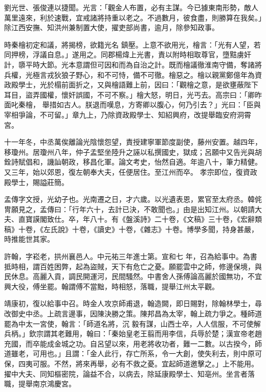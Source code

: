 \begin{pinyinscope}
 劉光世、張俊連以捷聞。光言：「觀金人布置，必有主謀。今已據東南形勢，敵人萬里遠來，利於速戰，宜戒諸將持重以老之。不過數月，彼食盡，則勝算在我矣。」除江西安撫、知洪州兼制置大使，擢吏部尚書，逾月，除參知政事。



 時秦檜初定和議，將揭榜，欲籍光名
 鎮壓。上意不欲用光，檜言：「光有人望，若同押榜，浮議自息。」遂用之。同郡楊煒上光書，責以附時相取尊官，墮黠虜奸計，隳平時大節。光本意謂但可因和而為自治之計。既而檜議徹淮南守備，奪諸將兵權，光極言戎狄狼子野心，和不可恃，備不可徹。檜惡之。檜以親黨鄭億年為資政殿學士，光於榻前面折之，又與檜語難上前，因曰：「觀檜之意，是欲壅蔽陛下耳目，盜弄國權，懷奸誤國，不可不察。」檜大怒，明日，光丐去。高宗曰：「卿昨面叱秦檜，
 舉措如古人。朕退而嘆息，方寄卿以腹心，何乃引去？」光曰：「臣與宰相爭論，不可留。」章九上，乃除資政殿學士、知紹興府，改提舉臨安府洞霄宮。



 十一年冬，中丞萬俟離論光陰懷怨望，責授建寧軍節度副使，藤州安置。越四年，移瓊州。居瓊州八年，仲子孟堅坐陸升之誣以私撰國史，獄成；呂願中又告光與胡銓詩賦倡和，譏訕朝政，移昌化軍。論文考史，怡然自適。年逾八十，筆力精健。又三年，始以郊恩，復左朝奉大夫，任便居住。至江州而卒。
 孝宗即位，復資政殿學士，賜謚莊簡。



 孟傳字文授，光幼子也。光南遷之日，才六歲。以光遺表恩，累官至太府丞。韓侂冑願見之，孟傳曰：「行年六十，去計已決，不敢聞也。」由是出知江州。以朝請大夫、直寶謨閣致仕。卒，年八十。有《盤溪詩》二十卷，《文稿》三十卷，《宏辭類稿》十卷，《左氏說》十卷，《讀史》十卷，《雜志》十卷。博學多聞，持身甚嚴，時推能世其家。



 許翰，字崧老，拱州襄邑人。中元祐三年進士第。宣和七
 年，召為給事中。為書抵時相，謂百姓困弊，起為盜賊，天下有危亡之憂。願罷雲中之師，修邊保境，與民休息。高麗入貢，調民開運河，民間騷然。中書舍人孫傅論高麗於國無功，不宜興大役，傅坐罷。翰謂傅不當黜，時相怒，落職，提舉江州太平觀。



 靖康初，復以給事中召。時金人攻京師甫退，翰造闕，即日賜對，除翰林學士，尋改御史中丞。上疏言邊事，因陳決勝之策。陳邦昌為太宰，翰上疏力爭之。種師道罷為中太一宮使，翰言：「師道名將，沉
 毅有謀，山西士卒，人人信服，不可使解兵柄。」欽宗謂其老難用，翰曰：「秦始皇老王翦而用李信，兵辱於楚；漢宣帝老趙充國，而卒能成金城之功。自呂望以來，用老將收功者，難一二數。以古揆今，師道雖老，可用也。」且謂：「金人此行，存亡所系，令一大創，使失利去，則中原可保，四夷可服。不然，將來再舉，必有不救之憂。宜起師道邀擊之。」上不能用。擢中大夫、同知樞密院，論益不合，以病去，除延康殿學士、知亳州。坐言者落職，提舉南京鴻慶宮。




\end{pinyinscope}

